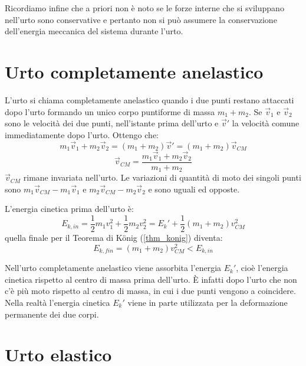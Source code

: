 \documentclass[class=book, crop=false, oneside, 12pt]{standalone}
\begin{document}
Ricordiamo infine che a priori non è noto se le forze interne che si sviluppano nell'urto sono conservative e pertanto non si può assumere la conservazione dell'energia meccanica del sistema durante l'urto.

\section{Urto completamente anelastico}

L'urto si chiama completamente anelastico quando i due punti restano attaccati dopo l'urto formando un unico corpo puntiforme di massa \(m_1 + m_2\).
Se \(\overrightarrow{v}_1\) e \(\overrightarrow{v}_2\) sono le velocità dei due punti, nell'istante prima dell'urto e \(\overrightarrow{v}'\) la velocità comune immediatamente dopo l'urto.
Ottengo che:
\begin{equation*}
    m_1 \overrightarrow{v}_1 + m_2 \overrightarrow{v}_2 = \left( m_1 + m_2 \right) \overrightarrow{v}' = \left( m_1 + m_2 \right) \overrightarrow{v}_{CM}
\end{equation*} 
\begin{equation*}
    \overrightarrow{v}_{CM} = \frac{m_1 \overrightarrow{v}_1 + m_2 \overrightarrow{v}_2}{m_1 + m_2}
\end{equation*}
\(\overrightarrow{v}_{CM}\) rimane invariata nell'urto. Le variazioni di quantità di moto dei singoli punti sono \(m_1 \overrightarrow{v}_{CM} - m_1 \overrightarrow{v}_{1}\) e \(m_2 \overrightarrow{v}_{CM} - m_2 \overrightarrow{v}_{2}\) e sono uguali ed opposte.

L'energia cinetica prima dell'urto è:
\begin{equation*}
    E_{k,in} = \frac{1}{2} m_1 v_1^2 + \frac{1}{2} m_2 v_2^2 = E_k' + \frac{1}{2} \left( m_1 + m_2 \right) v_{CM}^2
\end{equation*}
quella finale per il Teorema di König (\ref{thm_konig}) diventa:
\begin{equation*}
    E_{k,fin} = \left( m_1 + m_2 \right) v_{CM}^2 < E_{k,in}
\end{equation*}

Nell'urto completamente anelastico viene assorbita l'energia \(E_k'\), cioè l'energia cinetica rispetto al centro di massa prima dell'urto. 
È infatti dopo l'urto che non c'è più moto rispetto al centro di massa, in cui i due punti vengono a coincidere. 
Nella realtà l'energia cinetica \(E_k'\) viene in parte utilizzata per la deformazione permanente dei due corpi. 

\section{Urto elastico}
\end{document}

